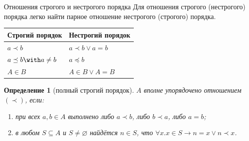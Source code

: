 \documentclass[aspectratio=169]{beamer}
\newtheorem{dfn}{Определение}[section]
\begin{document}
\begin{frame}{Отношения строгого и нестрогого порядка}
Для отношения строгого (нестрогого) порядка легко найти парное отношение нестрогого (строгого) порядка.
\begin{center}\begin{tabular}{l|l}
Строгий порядок & Нестрогий порядок \\\hline
$a \prec b$ & $a \prec b \vee a = b$\\
$a \preceq b \with a \ne b$ & $a \preceq b$\\\hline
$A \in B$ & $A \in B \vee A = B$
\end{tabular}\end{center}

\begin{dfn}[полный строгий порядок]
$A$ вполне упорядочено отношением $(\prec)$, если:
\begin{enumerate}
\item при всех $a,b \in A$ выполнено либо $a \prec b$, либо $b \prec a$, либо $a = b$;
\item в любом $S \subseteq A$ и $S \ne \varnothing$ найдётся $n \in S$, что $\forall x.x \in S \rightarrow n = x \vee n \prec x$.
\end{enumerate}
\end{dfn}
\end{frame}
\end{document}
